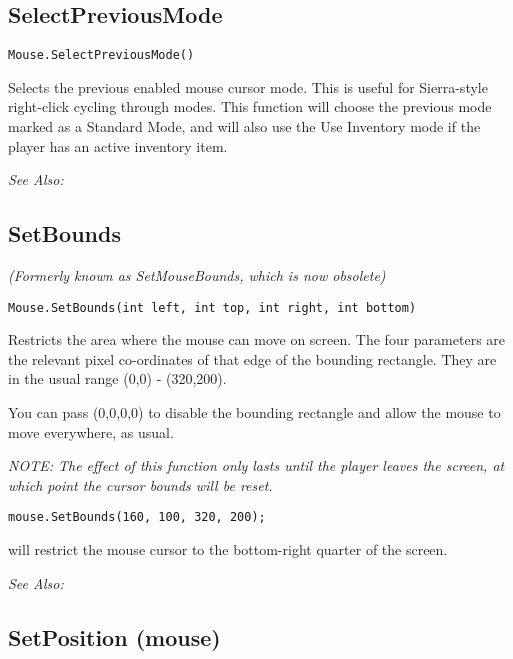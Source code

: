 \subsection{SelectPreviousMode}\label{Mouse.SelectPreviousMode}%

\begin{verbatim}
Mouse.SelectPreviousMode()
\end{verbatim}
Selects the previous enabled mouse cursor mode. This is useful for Sierra-style right-click
cycling through modes. This function will choose the previous mode marked as a Standard Mode, and
will also use the Use Inventory mode if the player has an active inventory item.

\it{See Also:} 


\subsection{SetBounds}\label{Mouse.SetBounds}%

\it{(Formerly known as SetMouseBounds, which is now obsolete)}

\begin{verbatim}
Mouse.SetBounds(int left, int top, int right, int bottom)
\end{verbatim}

Restricts the area where the mouse can move on screen. The four parameters are
the relevant pixel co-ordinates of that edge of the bounding rectangle. They are
in the usual range (0,0) - (320,200).

You can pass (0,0,0,0) to disable the bounding rectangle and allow the mouse to move
everywhere, as usual.

\it{NOTE:} The effect of this function only lasts until the player leaves the screen,
at which point the cursor bounds will be reset.

\begin{verbatim}
mouse.SetBounds(160, 100, 320, 200);
\end{verbatim}
will restrict the mouse cursor to the bottom-right quarter of the screen.

\it{See Also:} 


\subsection{SetPosition (mouse)}\label{Mouse.SetPosition}%

